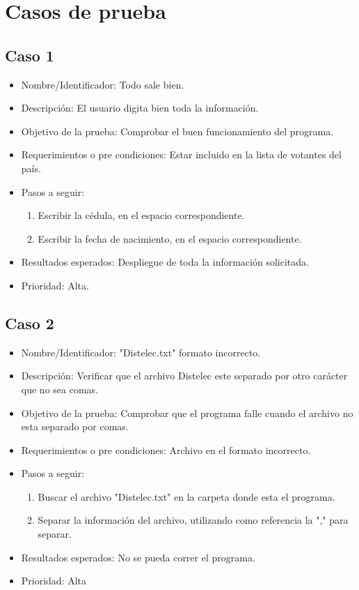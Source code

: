 \documentclass[conference]{IEEEtran}
\begin{document}
\section{Casos de prueba}

\subsection{Caso 1}
\begin{itemize}
\item Nombre/Identificador: Todo sale bien.
\item Descripción: El usuario digita bien toda la información.
\item Objetivo de la prueba: Comprobar el buen funcionamiento del programa.
\item Requerimientos o pre condiciones: Estar incluido en la lista de votantes del país.
\item Pasos a seguir: 
\begin{enumerate}
\item Escribir la cédula, en el espacio correspondiente.
\item Escribir la fecha de nacimiento, en el espacio correspondiente.
\end{enumerate}
\item Resultados esperados: Despliegue de toda la información solicitada.
\item Prioridad: Alta.
\end{itemize}

\subsection{Caso 2}
\begin{itemize}
\item Nombre/Identificador: "Distelec.txt" formato incorrecto.
\item Descripción: Verificar que el archivo Distelec este separado por otro carácter que no sea comas.
\item Objetivo de la prueba: Comprobar que el programa falle cuando el archivo no esta separado por comas. 
\item Requerimientos o pre condiciones: Archivo en el formato incorrecto.
\item Pasos a seguir: 
\begin{enumerate}
\item Buscar el archivo "Distelec.txt" en la carpeta donde esta el programa.
\item Separar la información del archivo, utilizando como referencia la "," para separar.
\end{enumerate}
\item Resultados esperados: No se pueda correr el programa.
\item Prioridad: Alta
\end{itemize}
\end{document}

